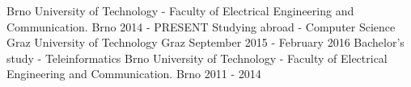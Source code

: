 

\begin{cventries}

  \cventry
    {Brno University of Technology - Faculty of Electrical Engineering and Communication.}
    {Brno}
    {2014 - PRESENT}
    {}
  \cventry
    {Studying abroad - Computer Science}
    {Graz University of Technology}
    {Graz}
    {September 2015 - February 2016}
    {}
  \cventry
    {Bachelor's study - Teleinformatics} %
    {Brno University of Technology - Faculty of Electrical Engineering and Communication.} %
    {Brno} %
    {2011 - 2014} %
    {}

\end{cventries}
